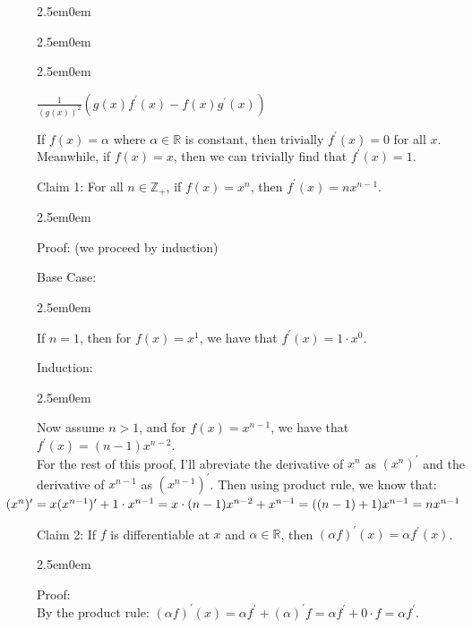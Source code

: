 \documentclass{book}
\newcommand{\exOne}{%
   \color{Purple}%
   \fontsize{14}{16}\selectfont%
}
\newcommand{\exTwo}{%
   \color{RedViolet}%
   \fontsize{13}{15}\selectfont%
}
\newcommand{\exP}{%
   \color{VioletRed}%
   \fontsize{12}{14}\selectfont%
}
\newenvironment{myIndent}{%
   \begin{adjustwidth}{2.5em}{0em}%
}{%
   \end{adjustwidth}%
}
\newcommand{\retTwo}{\hfill\bigbreak}
\begin{document}
{\begin{myIndent}
\begin{myIndent}
\begin{myIndent}
\begin{itemize}
            {\centering $\frac{1}{(g(x))^2}\left(g(x)f^\prime(x) - f(x)g^\prime(x)\right)$\par}
         \end{itemize}
      \end{myIndent}
   \end{myIndent}
\end{myIndent}}

\newpage

\exOne

If $f(x) = \alpha$ where $\alpha \in \mathbb{R}$ is constant, then trivially $f^\prime(x) = 0$ for all $x$.\\ Meanwhile, if $f(x) = x$, then we can trivially find that $f^\prime(x) = 1$.\retTwo

Claim 1: For all $n \in \mathbb{Z}_+$, if $f(x) = x^n$, then $f^\prime(x) = nx^{n-1}$.\\ [-15pt]

{\begin{myIndent}\exTwo
   Proof: (we proceed by induction)\retTwo

   Base Case: 
   {\begin{myIndent} \exP
      If $n = 1$, then for $f(x) = x^1$, we have that $f^\prime(x) = 1\cdot x^0$.\retTwo
   \end{myIndent}}

   Induction: 
   {\begin{myIndent}\exP
      Now assume $n > 1$, and for $f(x) = x^{n-1}$, we have that ${f^\prime(x) = (n-1)x^{n-2}\text{.}}$\\ For the rest of this proof, I'll abreviate the derivative of $x^n$ as $(x^n)^\prime$ and the\\ derivative of $x^{n-1}$ as $(x^{n-1})^\prime$. Then using product rule, we know that:\\ [-11pt]

      ${\hspace{-2.5em}(x^n)^\prime = x(x^{n-1})^\prime + 1\cdot x^{n-1} = x\cdot (n-1)x^{n-2} + x^{n-1} = ((n-1) + 1)x^{n-1} = nx^{n-1}}$\retTwo
   \end{myIndent}}
\end{myIndent}}

Claim 2: If $f$ is differentiable at $x$ and $\alpha \in \mathbb{R}$, then $(\alpha f)^\prime(x) = \alpha f^\prime(x)$.\\ [-15pt]

{\begin{myIndent}\exTwo
   Proof:\\ By the product rule: $(\alpha f)^\prime(x) = \alpha f^\prime + (\alpha)^\prime f = \alpha f^\prime + 0\cdot f = \alpha f^\prime$.\retTwo
\end{myIndent}}
\end{document}
